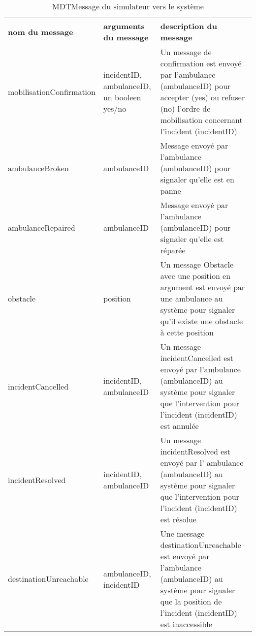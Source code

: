 \begin{table}[!h]
	\centering
	\begin{tabularx}{\marginparsep+\marginparwidth+\marginparpush+\textwidth}{|l|X|X|}
		\hline
		\textbf{nom du message} & \textbf{arguments du message} & \textbf{description du message} \\ \hline
		mobilisationConfirmation & incidentID, ambulanceID, un booleen yes/no & Un message de confirmation est envoyé par l'ambulance (ambulanceID) pour accepter (yes) ou refuser (no) l'ordre de mobilisation concernant l'incident (incidentID) \\ \hline 
		ambulanceBroken & ambulanceID & Message envoyé par l'ambulance (ambulanceID) pour signaler qu'elle est en panne \\ \hline
		ambulanceRepaired & ambulanceID & Message envoyé par l'ambulance (ambulanceID) pour signaler qu'elle est réparée \\ \hline
		obstacle & position & Un message Obstacle avec une position en argument est envoyé par une ambulance au système pour signaler qu'il existe une obstacle à cette position \\ \hline
		incidentCancelled & incidentID, ambulanceID & Un message incidentCancelled est envoyé par l'ambulance (ambulanceID) au système pour signaler que l'intervention pour l'incident (incidentID) est annulée \\ \hline
		incidentResolved & incidentID, ambulanceID & Un message incidentResolved est envoyé par l' ambulance (ambulanceID) au système pour signaler que l'intervention pour l'incident (incidentID) est résolue \\ \hline
		destinationUnreachable & ambulanceID, incidentID & Une message destinationUnreachable est envoyé par l'ambulance (ambulanceID) au système pour signaler que la position de l'incident (incidentID) est inaccessible \\ \hline
	\end{tabularx} 
	\caption{MDTMessage du simulateur vers le système}
	\label{tab:MDTMessage}
\end{table}
